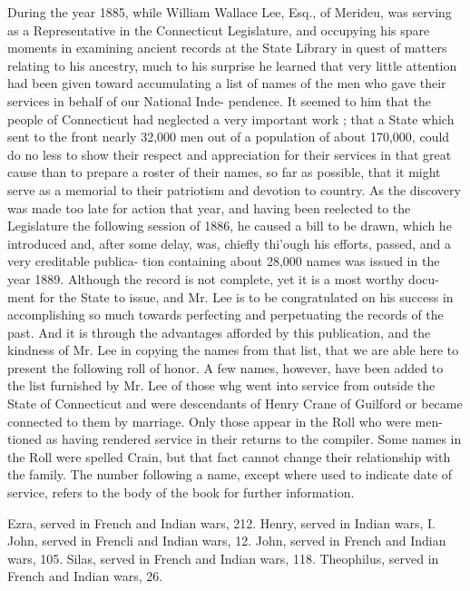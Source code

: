 During the year 1885, while William Wallace Lee, Esq., of 
Merideu, was serving as a Representative in the Connecticut 
Legislature, and occupying his spare moments in examining 
ancient records at the State Library in quest of matters relating 
to his ancestry, much to his surprise he learned that very little 
attention had been given toward accumulating a list of names of 
the men who gave their services in behalf of our National Inde- 
pendence. It seemed to him that the people of Connecticut had 
neglected a very important work ; that a State which sent to 
the front nearly 32,000 men out of a population of about 
170,000, could do no less to show their respect and appreciation 
for their services in that great cause than to prepare a roster of 
their names, so far as possible, that it might serve as a memorial 
to their patriotism and devotion to country. As the discovery 
was made too late for action that year, and having been reelected 
to the Legislature the following session of 1886, he caused a bill 
to be drawn, which he introduced and, after some delay, was, 
chiefly thi'ough his efforts, passed, and a very creditable publica- 
tion containing about 28,000 names was issued in the year 1889. 
Although the record is not complete, yet it is a most worthy docu- 
ment for the State to issue, and Mr. Lee is to be congratulated 
on his success in accomplishing so much towards perfecting and 
perpetuating the records of the past. And it is through the 
advantages afforded by this publication, and the kindness of Mr. 
Lee in copying the names from that list, that we are able here to 
present the following roll of honor. A few names, however, 
have been added to the list furnished by Mr. Lee of those whg 
went into service from outside the State of Connecticut and were 
descendants of Henry Crane of Guilford or became connected to 
them by marriage. Only those appear in the Roll who were men- 
tioned as having rendered service in their returns to the compiler. 
Some names in the Roll were spelled Crain, but that fact cannot 
change their relationship with the family. The number following 
a name, except where used to indicate date of service, refers to 
the body of the book for further information. 

Ezra, served in French and Indian wars, 212. 
Henry, served in Indian wars, I. 
John, served in Frencli and Indian wars, 12. 
John, served in French and Indian wars, 105. 
Silas, served in French and Indian wars, 118. 
Theophilus, served in French and Indian wars, 26. 



